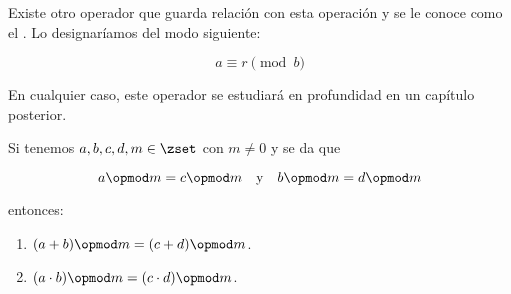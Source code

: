 Existe otro operador que guarda relación con esta operación y se le conoce
como el . Lo designaríamos del modo siguiente:

$$ a \equiv r \pmod b $$

En cualquier caso, este operador se estudiará en profundidad en un capítulo
posterior.

\begin{properties}
  Si tenemos $a, b, c, d, m \in \zset$ con $m \neq 0$ y se da que

  $$ a \opmod m = c \opmod m \quad \text{y} \quad b \opmod m = d \opmod m $$

  \noindent entonces:

  \begin{enumerate}
    \item $(a + b) \opmod m = (c + d) \opmod m$.
    \item $(a \cdot b) \opmod m = (c \cdot d) \opmod m$.
  \end{enumerate}
\end{properties}

